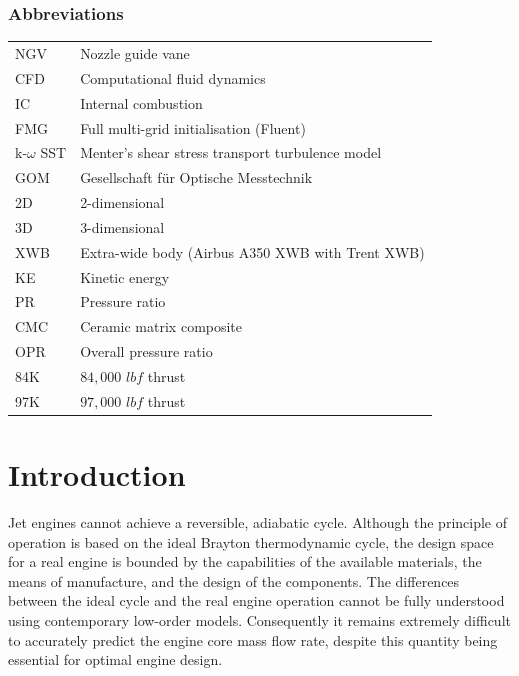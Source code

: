 \documentclass[a4paper, 11pt, oneside]{report}
\begin{document}
\subsection*{Abbreviations}
\begin{table}[H]
\begin{center}
\begin{tabular}{ll}
NGV & Nozzle guide vane \\
CFD & Computational fluid dynamics \\
IC & Internal combustion \\
FMG & Full multi-grid initialisation (Fluent) \\
k-$\omega$ SST & Menter's shear stress transport turbulence model \\
GOM & Gesellschaft f\"ur Optische Messtechnik \\
2D & 2-dimensional \\
3D & 3-dimensional \\
XWB & Extra-wide body (Airbus A350 XWB with Trent XWB) \\
KE & Kinetic energy \\
PR & Pressure ratio \\
CMC & Ceramic matrix composite \\
OPR & Overall pressure ratio \\
84K & $84,000$ $lbf$ thrust \\
97K & $97,000$ $lbf$ thrust
\end{tabular}
\end{center}
\end{table}



\chapter{Introduction}
\label{chapter_introduction}



Jet engines cannot achieve a reversible, adiabatic cycle. Although the principle of operation is based on the ideal Brayton thermodynamic cycle, the design space for a real engine is bounded by the capabilities of the available materials, the means of manufacture, and the design of the components. The differences between the ideal cycle and the real engine operation cannot be fully understood using contemporary low-order models. Consequently it remains extremely difficult to accurately predict the engine core mass flow rate, despite this quantity being essential for optimal engine design.
\end{document}
